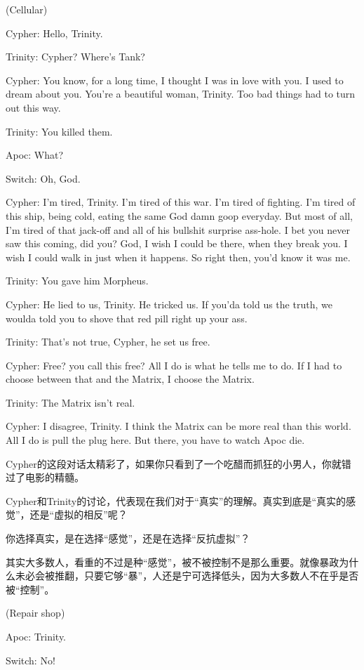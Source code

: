 \documentclass[UTF8]{ctexart}
\newenvironment{myquote}{\color{green} \setlength{\leftskip}{6em} \setlength{\rightskip}{4em} \setlength{\parindent}{-2em}}{\par}
\begin{document}
\begin{myquote}
(Cellular)

Cypher: Hello, Trinity.

Trinity: Cypher? Where's Tank?

Cypher: You know, for a long time, I thought I was in love with you. I used to dream about you. You're a beautiful woman, Trinity. Too bad things had to turn out this way.

Trinity: You killed them.

Apoc: What?

Switch: Oh, God.

Cypher: I'm tired, Trinity. I'm tired of this war. I'm tired of fighting. I'm tired of this ship, being cold, eating the same God damn goop everyday. But most of all, I'm tired of that jack-off and all of his bullshit surprise ass-hole. I bet you never saw this coming, did you? God, I wish I could be there, when they break you. I wish I could walk in just when it happens. So right then, you'd know it was me.

Trinity: You gave him Morpheus.

Cypher: He lied to us, Trinity. He tricked us. If you'da told us the truth, we woulda told you to shove that red pill right up your ass.

Trinity: That's not true, Cypher, he set us free.

Cypher: Free? you call this free? All I do is what he tells me to do. If I had to choose between that and the Matrix, I choose the Matrix.

Trinity: The Matrix isn't real.

Cypher: I disagree, Trinity. I think the Matrix can be more real than this world. All I do is pull the plug here. But there, you have to watch Apoc die.
\end{myquote}

Cypher的这段对话太精彩了，如果你只看到了一个吃醋而抓狂的小男人，你就错过了电影的精髓。

Cypher和Trinity的讨论，代表现在我们对于“真实”的理解。真实到底是“真实的感觉”，还是“虚拟的相反”呢？

你选择真实，是在选择“感觉”，还是在选择“反抗虚拟”？

其实大多数人，看重的不过是种“感觉”，被不被控制不是那么重要。就像暴政为什么未必会被推翻，只要它够“暴”，人还是宁可选择低头，因为大多数人不在乎是否被“控制”。

\begin{myquote}
(Repair shop)

Apoc: Trinity.

Switch: No!
\end{myquote}
\end{document}
